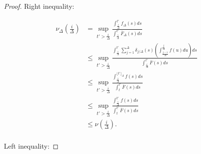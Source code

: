 \documentclass[11pt]{article}
\renewcommand{\leq}{\leqslant}
\begin{document}
\begin{proof}
    
    Right  inequality:

    \begin{align*}
        \nu_\Delta(\frac{i}{\Delta}) 
        &= \sup_{t'>\frac{i}{\Delta}} \frac{\int_{\frac{i}{\Delta}}^{t'}
        f_\Delta(s)ds}{\int_{\frac{i}{\Delta}}^{t'} \bar{F}_\Delta(s) ds} \\
        &\leq \sup_{t'> \frac{i}{\Delta}} \frac{\int_{\frac{i}{\Delta}}^{t'}
        \sum_{j=1}^\Delta \delta_{j/\Delta}(s)  \left( \int_{\frac{j-1}{\Delta}}^{\frac{j}{\Delta}} f(u) du \right) ds}{\int_{\frac{i}{\Delta}}^{t'} \bar{F}(s) ds} \\
        &\leq \sup_{t'>\frac{i}{\Delta}} \frac{\int_{\frac{i}{\Delta}}^{\lfloor t' \rfloor_\Delta} f(s)
        ds}{\int_{t}^{t'} \bar{F}(s) ds} \\
        &\leq \sup_{t'>\frac{i}{\Delta}} \frac{\int_{\frac{i}{\Delta}}^{t'} f(s) ds}{\int_{t}^{t'}
        \bar{F}(s) ds} \\
        &\leq \nu(\frac{i}{\Delta}). \\
    \end{align*}


   Left  inequality:


\end{proof}
\end{document}
